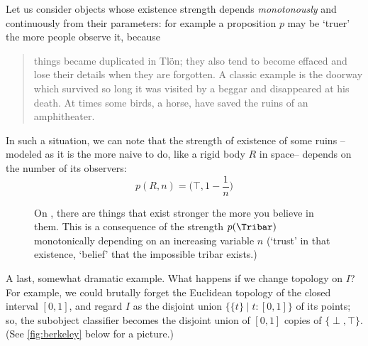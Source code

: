 \begin{example}\label{blu}
  Let us consider objects whose existence strength depends \emph{monotonously} and continuously from their parameters: for example a proposition $p$ may be `truer' the more people observe it, because
  \begin{quote}
    things became duplicated in Tlön; they also tend to become effaced and lose their details when they are forgotten. A classic example is the doorway which survived so long it was visited by a beggar and disappeared at his death. At times some birds, a horse, have saved the ruins of an amphitheater.  \hfill\cite{tlonEN}
  \end{quote}
  In such a situation, we can note that the strength of existence of some ruins --modeled as it is the more naive to do, like a rigid body $R$ in space-- depends on the number of its observers:
  \[\textstyle p(R, n) = \big(\top, 1-\frac{1}{n}\big)\]
  \begin{figure}[h]
    \begin{center}
    \end{center}
    \caption{On \tlon, there are things that exist stronger the more you believe in them. This is a consequence of the strength $p(\Tribar)$ monotonically depending on an increasing variable $n$ (`trust' in that existence, `belief' that the impossible tribar \Tribar exists.)}
  \end{figure}
\end{example}
A last, somewhat dramatic example. What happens if we change topology on $I$? For example, we could brutally forget the Euclidean topology of the closed interval $[0,1]$, and regard $I$ as the disjoint union $\{ \{t\} \mid t: [0,1]\}$ of its points; so, the subobject classifier becomes the disjoint union of $[0,1]$ copies of $\{\perp,\top\}$. (See \autoref{fig:berkeley} below for a picture.)
